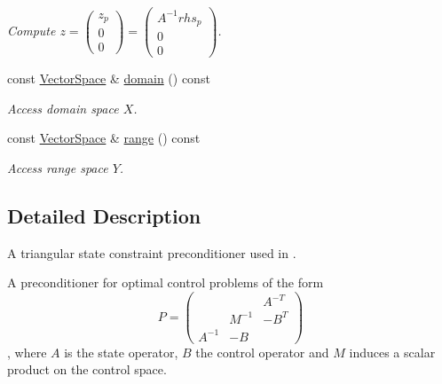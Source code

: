 \begin{DoxyCompactItemize}
\begin{DoxyCompactList}\small\item\em Compute $ z = \left( \begin{array}{c} z_p \\ 0 \\ 0 \end{array} \right) = \left( \begin{array}{c} A^{-1}rhs_p \\ 0 \\ 0 \end{array} \right) $. \end{DoxyCompactList}\item 
\hypertarget{classSpacy_1_1OperatorBase_a2588f9b3e0188820c4c494e63293dc6f}{const \hyperlink{classSpacy_1_1VectorSpace}{Vector\-Space} \& \hyperlink{classSpacy_1_1OperatorBase_a2588f9b3e0188820c4c494e63293dc6f}{domain} () const }\label{classSpacy_1_1OperatorBase_a2588f9b3e0188820c4c494e63293dc6f}

\begin{DoxyCompactList}\small\item\em Access domain space $X$. \end{DoxyCompactList}\item 
\hypertarget{classSpacy_1_1OperatorBase_ab19d3b7a6f290b1079248f1e567e53d6}{const \hyperlink{classSpacy_1_1VectorSpace}{Vector\-Space} \& \hyperlink{classSpacy_1_1OperatorBase_ab19d3b7a6f290b1079248f1e567e53d6}{range} () const }\label{classSpacy_1_1OperatorBase_ab19d3b7a6f290b1079248f1e567e53d6}

\begin{DoxyCompactList}\small\item\em Access range space $Y$. \end{DoxyCompactList}\end{DoxyCompactItemize}


\subsection{Detailed Description}
A triangular state constraint preconditioner used in \cite{Lubkoll2015a}. 

A preconditioner for optimal control problems of the form \[ P=\left( \begin{array}{ccc} & & A^{-T} \\ & M^{-1} & -B^T \\ A^{-1} & -B & \end{array} \right)\], where $A$ is the state operator, $B$ the control operator and $M$ induces a scalar product on the control space. 

